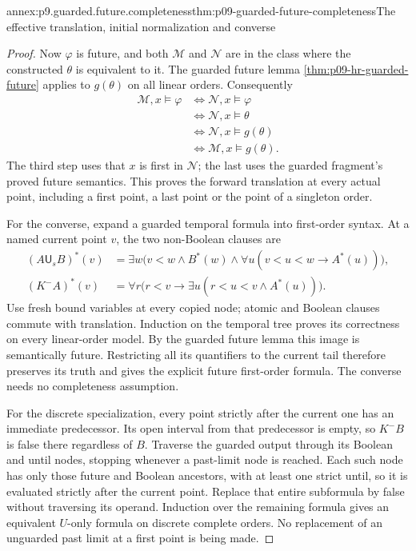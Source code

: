 \begin{annexitem}{annex:p9.guarded.future.completeness}{thm:p09-guarded-future-completeness}{The effective translation, initial normalization and converse}
\begin{proof}
Now \(\varphi\)
is future,
and both
\(\mathcal M\)
and \(\mathcal N\)
are in the
class where
the constructed
\(\theta\)
is equivalent
to it.
The guarded
future lemma
\cref{thm:p09-hr-guarded-future}
applies to
\(g(\theta)\)
on all
linear orders.
Consequently
\[
\begin{aligned}
 \mathcal M,x\models\varphi
 &\Longleftrightarrow \mathcal N,x\models\varphi\\
 &\Longleftrightarrow \mathcal N,x\models\theta\\
 &\Longleftrightarrow \mathcal N,x\models g(\theta)\\
 &\Longleftrightarrow \mathcal M,x\models g(\theta).
\end{aligned}
\]
The third
step uses
that \(x\)
is first
in \(\mathcal N\);
the last
uses the
guarded
fragment's
proved
future
semantics.
This proves
the forward
translation
at every
actual point,
including a
first point,
a last point
or the point
of a singleton
order.

For the converse,
expand a
guarded temporal
formula into
first-order
syntax. At
a named
current point
\(v\), the
two non-Boolean
clauses are
\[
\begin{aligned}
 (A\mathbin{\mathsf U_s}B)^*(v)
   &=\exists w\bigl(v<w\land B^*(w)\land
             \forall u(v<u<w\to A^*(u))\bigr),\\
 (K^-A)^*(v)
   &=\forall r\bigl(r<v\to
             \exists u(r<u<v\land A^*(u))\bigr).
\end{aligned}
\]
Use fresh
bound variables
at every
copied node;
atomic and
Boolean clauses
commute with
translation.
Induction on
the temporal
tree proves
its correctness
on every
linear-order
model. By
the guarded
future lemma
this image
is semantically
future. Restricting
all its
quantifiers
to the
current tail
therefore
preserves its
truth and
gives the
explicit future
first-order
formula.
The converse
needs no
completeness
assumption.

For the
discrete
specialization,
every point
strictly after
the current
one has
an immediate
predecessor.
Its open
interval from
that predecessor
is empty,
so \(K^-B\)
is false
there regardless
of \(B\).
Traverse the
guarded output
through its
Boolean and
until nodes,
stopping whenever
a past-limit
node is reached.
Each such node
has only those
future and Boolean
ancestors, with
at least one
strict until,
so it is
evaluated strictly
after the current
point. Replace
that entire
subformula by
false without
traversing its
operand.
Induction over
the remaining
formula gives
an equivalent
\(U\)-only
formula on
discrete
complete
orders.
No replacement
of an
unguarded
past limit
at a first
point is
being made.


\end{proof}
\end{annexitem}
